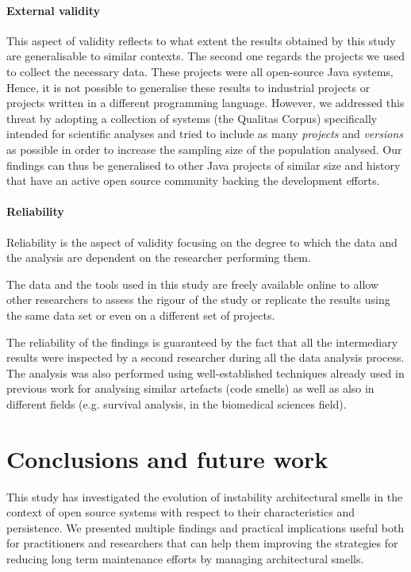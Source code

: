 \paragraph{External validity}
This aspect of validity reflects to what extent the results obtained by this study are generalisable to similar contexts.
The second one regards the projects we used to collect the necessary data. These projects were all open-source Java systems, Hence, it is not possible to generalise these results to industrial projects or projects written in a different programming language.
However, we addressed this threat by adopting a collection of systems (the Qualitas Corpus) specifically intended for scientific analyses and tried to include as many \emph{projects} and \emph{versions} as possible in order to increase the sampling size of the population analysed.
Our findings can thus be generalised to other Java projects of similar size and history that have an active open source community backing the development efforts.

\paragraph{Reliability}
Reliability is the aspect of validity focusing on the degree to which the data and the analysis are dependent on the researcher performing them.

The data and the tools used in this study are freely available online to allow other researchers to assess the rigour of the study or replicate the results using the same data set or even on a different set of projects.

The reliability of the findings is guaranteed by the fact that all the intermediary results were inspected by a second researcher during all the data analysis process.
The analysis was also performed using well-established techniques already used in previous work for analysing similar artefacts (code smells) as well as also in different fields (e.g. survival analysis, in the biomedical sciences field).


\section{Conclusions and future work}\label{c3:sec:conclusions}
This study has investigated the evolution of instability architectural smells in the context of open source systems with respect to their characteristics and persistence.
We presented multiple findings and practical implications useful both for practitioners and researchers that can help them improving the strategies for reducing long term maintenance efforts by managing architectural smells.

